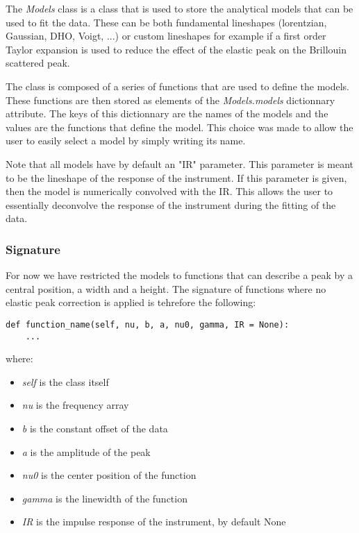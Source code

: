 The \textit{Models} class is a class that is used to store the analytical models that can be used to fit the data. These can be both fundamental lineshapes (lorentzian, Gaussian, DHO, Voigt, ...) or custom lineshapes for example if a first order Taylor expansion is used to reduce the effect of the elastic peak on the Brillouin scattered peak. 

The class is composed of a series of functions that are used to define the models. These functions are then stored as elements of the \textit{Models.models} dictionnary attribute. The keys of this dictionnary are the names of the models and the values are the functions that define the model. This choice was made to allow the user to easily select a model by simply writing its name. 

Note that all models have by default an "IR" parameter. This parameter is meant to be the lineshape of the response of the instrument. If this parameter is given, then the model is numerically convolved with the IR. This allows the user to essentially deconvolve the response of the instrument during the fitting of the data.

\subsubsection{Signature}

For now we have restricted the models to functions that can describe a peak by a central position, a width and a height. The signature of functions where no elastic peak correction is applied is tehrefore the following:
\begin{lstlisting}
def function_name(self, nu, b, a, nu0, gamma, IR = None):
    ...
\end{lstlisting}

where:
\begin{itemize}
    \item \textit{self} is the class itself
    \item \textit{nu} is the frequency array
    \item \textit{b} is the constant offset of the data
    \item \textit{a} is the amplitude of the peak
    \item \textit{nu0} is the center position of the function
    \item \textit{gamma} is the linewidth of the function
    \item \textit{IR} is the impulse response of the instrument, by default None
\end{itemize}

